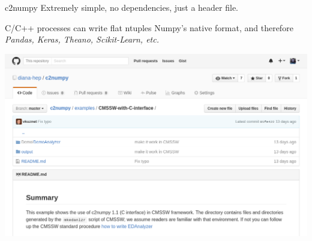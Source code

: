 \documentclass{beamer}
\begin{document}
\begin{frame}{c2numpy}
\vspace{0.5 cm}
Extremely simple, no dependencies, just a header file.

\vspace{0.25 cm}
C/C++ processes can write flat ntuples Numpy's native format, and therefore {\it Pandas, Keras, Theano, Scikit-Learn, etc.}

\begin{center}
\includegraphics[width=0.9\linewidth]{c2numpy.png}
\end{center}
\end{frame}
\end{document}
